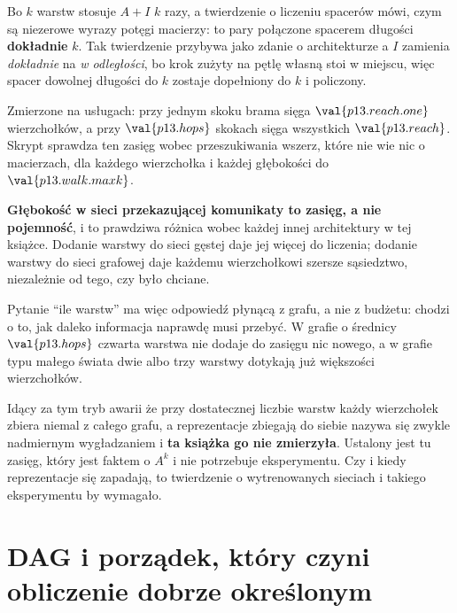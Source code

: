 \begin{fr}
Bo $k$ warstw stosuje $A + I$ $k$ razy, a twierdzenie o liczeniu spacerów mówi,
czym są niezerowe wyrazy potęgi macierzy: to pary połączone spacerem długości
\textbf{dokładnie} $k$. Tak twierdzenie przybywa jako zdanie o architekturze
\dash{} a $I$ zamienia \emph{dokładnie} na \emph{w odległości}, bo krok zużyty
na pętlę własną stoi w miejscu, więc spacer dowolnej długości do $k$ zostaje
dopełniony do $k$ i policzony.

Zmierzone na usługach: przy jednym skoku brama sięga
$\val{p13.reach.one}$ wierzchołków, a przy $\val{p13.hops}$ skokach sięga
wszystkich $\val{p13.reach}$. Skrypt sprawdza ten zasięg wobec przeszukiwania
wszerz, które nie wie nic o macierzach, dla każdego wierzchołka i każdej
głębokości do $\val{p13.walk.maxk}$.

\begin{aibox}
\textbf{Głębokość w sieci przekazującej komunikaty to zasięg, a nie
pojemność}, i to prawdziwa różnica wobec każdej innej architektury w tej
książce. Dodanie warstwy do sieci gęstej daje jej więcej do liczenia; dodanie
warstwy do sieci grafowej daje każdemu wierzchołkowi szersze sąsiedztwo,
niezależnie od tego, czy było chciane.

Pytanie \enquote{ile warstw} ma więc odpowiedź płynącą z grafu, a nie z
budżetu: chodzi o to, jak daleko informacja naprawdę musi przebyć. W grafie o
średnicy $\val{p13.hops}$ czwarta warstwa nie dodaje do zasięgu nic nowego, a
w grafie typu małego świata dwie albo trzy warstwy dotykają już większości
wierzchołków.
\end{aibox}

\begin{warning}
Idący za tym tryb awarii \dash{} że przy dostatecznej liczbie warstw każdy
wierzchołek zbiera niemal z całego grafu, a reprezentacje zbiegają do siebie
\dash{} nazywa się zwykle nadmiernym wygładzaniem i \textbf{ta książka go nie
zmierzyła}. Ustalony jest tu zasięg, który jest faktem o $A^{k}$ i nie
potrzebuje eksperymentu. Czy i kiedy reprezentacje się zapadają, to twierdzenie
o wytrenowanych sieciach i takiego eksperymentu by wymagało.
\end{warning}
\end{fr}

\section{DAG i porządek, który czyni obliczenie dobrze określonym}
\label{sec:P13-dag}

